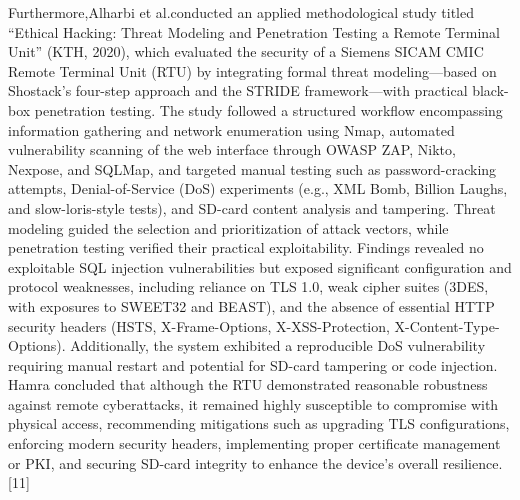 \documentclass[12pt,a4paper]{report}
\begin{document}
Furthermore,Alharbi et al.conducted an applied methodological study titled “Ethical Hacking: Threat Modeling and Penetration Testing a Remote Terminal Unit” (KTH, 2020), which evaluated the security of a Siemens SICAM CMIC Remote Terminal Unit (RTU) by integrating formal threat modeling—based on Shostack’s four-step approach and the STRIDE framework—with practical black-box penetration testing. The study followed a structured workflow encompassing information gathering and network enumeration using Nmap, automated vulnerability scanning of the web interface through OWASP ZAP, Nikto, Nexpose, and SQLMap, and targeted manual testing such as password-cracking attempts, Denial-of-Service (DoS) experiments (e.g., XML Bomb, Billion Laughs, and slow-loris-style tests), and SD-card content analysis and tampering. Threat modeling guided the selection and prioritization of attack vectors, while penetration testing verified their practical exploitability. Findings revealed no exploitable SQL injection vulnerabilities but exposed significant configuration and protocol weaknesses, including reliance on TLS 1.0, weak cipher suites (3DES, with exposures to SWEET32 and BEAST), and the absence of essential HTTP security headers (HSTS, X-Frame-Options, X-XSS-Protection, X-Content-Type-Options). Additionally, the system exhibited a reproducible DoS vulnerability requiring manual restart and potential for SD-card tampering or code injection. Hamra concluded that although the RTU demonstrated reasonable robustness against remote cyberattacks, it remained highly susceptible to compromise with physical access, recommending mitigations such as upgrading TLS configurations, enforcing modern security headers, implementing proper certificate management or PKI, and securing SD-card integrity to enhance the device’s overall resilience. [11]
\end{document}
